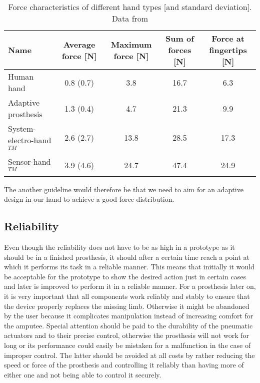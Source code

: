 \documentclass[main]{subfiles}
\begin{document}
\begin{table}[H]
\scriptsize
\begin{adjustwidth}{-1.5em}{-1.5em}
\begin{tabular}{lcccc}
\toprule
Name & Average force [N] & Maximum force [N] & Sum of forces [N] & Force at fingertips [N]\\
\midrule

Human hand & 0.8 (0.7) & 3.8 & 16.7 & 6.3 \\
Adaptive prosthesis & 1.3 (0.4) & 4.7 & 21.3 & 9.9\\
System-electro-hand$^{TM}$ & 2.6 (2.7) & 13.8 & 28.5 & 17.3\\
Sensor-hand$^{TM}$ & 3.9 (4.6) & 24.7 & 47.4 & 24.9\\
\bottomrule
\end{tabular}
\caption[Force characteristics of different hand types]{Force characteristics of different hand types [and standard deviation]. Data from \cite{Kargov2004}}
\label{force-distribution}
\normalsize
\end{adjustwidth}
\end{table}

The another guideline would therefore be that we need to aim for an adaptive design in our hand to achieve a good force distribution.

\subsection{Reliability}
Even though the reliability does not have to be as high in a prototype as it should be in a finished prosthesis, it should after a certain time reach a point at which it performs its task in a reliable manner. This means that initially it would be acceptable for the prototype to show the desired action just in certain cases and later is improved to perform it in a reliable manner. For a prosthesis later on, it is very important that all components work reliably and stably to ensure that the device properly replaces the missing limb. Otherwise it might be abandoned by the user because it complicates manipulation instead of increasing comfort for the amputee. Special attention should be paid to the durability of the pneumatic actuators and to their precise control, otherwise the prosthesis will not work for long or its performance could easily be mistaken for a malfunction in the case of improper control. The latter should be avoided at all costs by rather reducing the speed or force of the prosthesis and controlling it reliably than having more of either one and not being able to control it securely.
\end{document}
